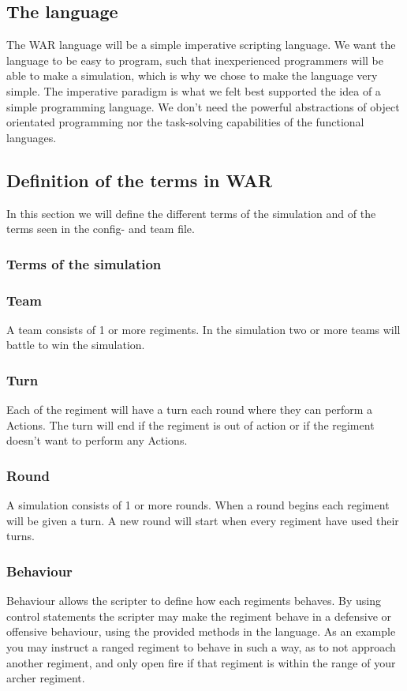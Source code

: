 	\subsection{The language}
		The WAR language will be a simple imperative scripting language. 
		We want the language to be easy to program, such that inexperienced programmers will be able to make a simulation, which is why we chose to
		make the language very simple. The imperative paradigm is what we felt best supported the idea of a simple programming language. We don't need the
		powerful abstractions of object orientated programming nor the task-solving capabilities of the functional languages.
		
		 
	\subsection{Definition of the terms in WAR}
	In this section we will define the different terms of the simulation and of the terms seen in the config- and team file.
	
		\subsubsection{Terms of the simulation}
		
		\subsubsection{Team}		
		A team consists of 1 or more regiments. In the simulation two or more teams will battle to win the simulation.
		
		\subsubsection{Turn}
		Each of the regiment will have a turn each round where they can perform a Actions. The turn will end if the regiment is out of
		action or if the regiment doesn't want to perform any Actions.
		
		\subsubsection{Round}
		A simulation consists of 1 or more rounds. When a round begins each regiment will be given a turn. 
		A new round will start when every regiment have used their turns.

		\subsubsection{Behaviour}
		Behaviour allows the scripter to define how each regiments behaves. 
		By using control statements the scripter may make the regiment behave in a defensive or offensive behaviour, 
		using the provided methods in the language. As an example you may instruct a ranged regiment to behave in such a way, 
		as to not approach another regiment, and only open fire if that regiment is within the range of your archer regiment.
				
